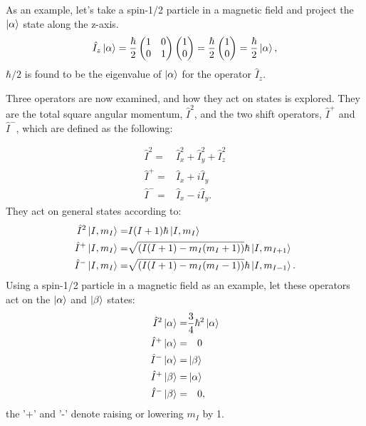 As an example, let's take a spin-1/2 particle in a magnetic field
and project the $\ket{\alpha}$ state along the z-axis.
\begin{equation}\label{eqn:operators}
  \hat{I}_z\ket{\alpha} = \frac{\hbar}{2}\begin{pmatrix}
    1 & 0\\
    0 & 1
\end{pmatrix}
\begin{pmatrix}
  1\\
  0
\end{pmatrix} = \frac{\hbar}{2}\begin{pmatrix}
  1\\
  0
\end{pmatrix} = \frac{\hbar}{2}\ket{\alpha},
\end{equation}
$\hbar/2$ is found to be the eigenvalue of $\ket{\alpha}$ for the operator $\hat{I}_z$.

Three operators are now examined, and how they act on states is explored. They are the total square angular momentum, $\hat{I}^2$,
and the two shift operators, $\hat{I}^+$ and $\hat{I}^-$, which are defined as the following:

\begin{align}
  \hat{I}^2 =& \hat{I}_x^2 + \hat{I}_y^2 + \hat{I}_z^2\\
  \hat{I}^+ =& \hat{I}_x + i\hat{I}_y\\
  \hat{I}^- =& \hat{I}_x - i\hat{I}_y.
\end{align}
They act on general states according to:
\begin{align}
  \hat{I}^2\ket{I,m_I} =& I(I+1)\hbar\ket{I, m_I}\\
  \hat{I}^+\ket{I,m_I} =& \sqrt{(I(I+1)-m_I(m_I+1))}\hbar\ket{I,m_{I+1}}\\
  \hat{I}^-\ket{I,m_I} =& \sqrt{(I(I+1)-m_I(m_I-1))}\hbar\ket{I,m_{I-1}}.
\end{align}
Using a spin-1/2 particle in a magnetic field as an example, let these operators act on the $\ket{\alpha}$ and $\ket{\beta}$ states:
\begin{align}
  \hat{I}^2\ket{\alpha} =& \frac{3}{4}\hbar^2\ket{\alpha}\\
  \hat{I}^+\ket{\alpha} =&\quad0\\
  \hat{I}^-\ket{\alpha} =& \ket{\beta}\\
  \hat{I}^+\ket{\beta} =& \ket{\alpha}\\
  \hat{I}^-\ket{\beta} =&\quad0,
\end{align}
the '+' and '-' denote raising or lowering $m_I$ by 1.

